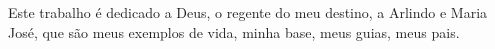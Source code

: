 Este trabalho é dedicado a Deus, o regente do meu destino, a Arlindo e Maria José, que são meus exemplos de vida, minha base, meus guias, meus pais.